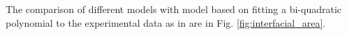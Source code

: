 \documentclass[a4paper,12pt]{article}
\newcommand{\rp}{\mbox{$p_d\xspace$}} %
\begin{document}
The comparison of different models with model based on fitting a bi-quadratic
polynomial to the experimental data as in \cite{Porter2010} are in
Fig. \ref{fig:interfacial_area}.
\begin{figure*}
  \centering
  \resizebox{0.95\linewidth}{!}{}
  \caption{Water-gas inter-facial area computed with different
    models. Used parameters: $\phi=0.39$, $\alpha=0.0012$, $n=5.48$, $\rp=1.5e-3\text{m}$.}
  \label{fig:interfacial_area}
\end{figure*}



\end{document}
